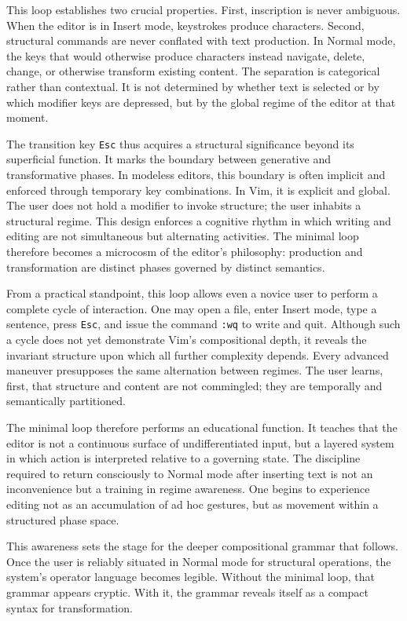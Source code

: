 \documentclass[12pt]{article}
\begin{document}
This loop establishes two crucial properties. First, inscription is never ambiguous. When the editor is in Insert mode, keystrokes produce characters. Second, structural commands are never conflated with text production. In Normal mode, the keys that would otherwise produce characters instead navigate, delete, change, or otherwise transform existing content. The separation is categorical rather than contextual. It is not determined by whether text is selected or by which modifier keys are depressed, but by the global regime of the editor at that moment.

The transition key \texttt{Esc} thus acquires a structural significance beyond its superficial function. It marks the boundary between generative and transformative phases. In modeless editors, this boundary is often implicit and enforced through temporary key combinations. In Vim, it is explicit and global. The user does not hold a modifier to invoke structure; the user inhabits a structural regime. This design enforces a cognitive rhythm in which writing and editing are not simultaneous but alternating activities. The minimal loop therefore becomes a microcosm of the editor’s philosophy: production and transformation are distinct phases governed by distinct semantics.

From a practical standpoint, this loop allows even a novice user to perform a complete cycle of interaction. One may open a file, enter Insert mode, type a sentence, press \texttt{Esc}, and issue the command \texttt{:wq} to write and quit. Although such a cycle does not yet demonstrate Vim’s compositional depth, it reveals the invariant structure upon which all further complexity depends. Every advanced maneuver presupposes the same alternation between regimes. The user learns, first, that structure and content are not commingled; they are temporally and semantically partitioned.

The minimal loop therefore performs an educational function. It teaches that the editor is not a continuous surface of undifferentiated input, but a layered system in which action is interpreted relative to a governing state. The discipline required to return consciously to Normal mode after inserting text is not an inconvenience but a training in regime awareness. One begins to experience editing not as an accumulation of ad hoc gestures, but as movement within a structured phase space.

This awareness sets the stage for the deeper compositional grammar that follows. Once the user is reliably situated in Normal mode for structural operations, the system’s operator language becomes legible. Without the minimal loop, that grammar appears cryptic. With it, the grammar reveals itself as a compact syntax for transformation.
\end{document}
